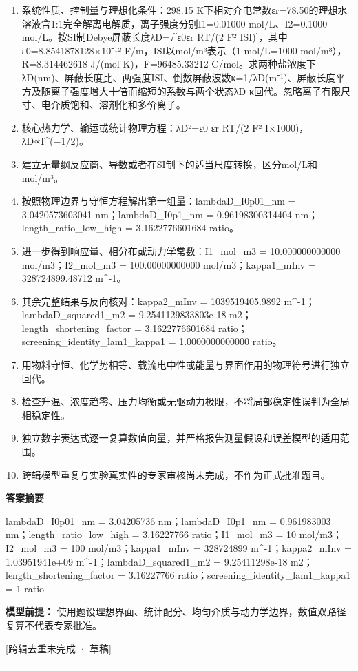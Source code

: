 \documentclass[UTF8,11pt,a4paper]{ctexart}
\begin{document}
\begin{enumerate}
\item 系统性质、控制量与理想化条件：298.15 K下相对介电常数εr=78.50的理想水溶液含1:1完全解离电解质，离子强度分别I1=0.01000 mol/L、I2=0.1000 mol/L。按SI制Debye屏蔽长度λD=√[ε0εr RT/(2 F² ISI)]，其中ε0=8.8541878128×10⁻¹² F/m，ISI以mol/m³表示（1 mol/L=1000 mol/m³），R=8.314462618 J/(mol K)，F=96485.33212 C/mol。求两种盐浓度下λD(nm)、屏蔽长度比、两强度ISI、倒数屏蔽波数κ=1/λD(m⁻¹)、屏蔽长度平方及随离子强度增大十倍而缩短的系数与两个状态λD κ回代。忽略离子有限尺寸、电介质饱和、溶剂化和多价离子。
\item 核心热力学、输运或统计物理方程：λD²=ε0 εr RT/(2 F² I×1000)，λD∝I\textasciicircum{}(−1/2)。
\item 建立无量纲反应商、导数或者在SI制下的适当尺度转换，区分mol/L和mol/m³。
\item 按照物理边界与守恒方程解出第一组量：lambdaD\_I0p01\_nm = 3.0420573603041 nm；lambdaD\_I0p1\_nm = 0.96198300314404 nm；length\_ratio\_low\_high = 3.1622776601684 ratio。
\item 进一步得到响应量、相分布或动力学常数：I1\_mol\_m3 = 10.000000000000 mol/m3；I2\_mol\_m3 = 100.00000000000 mol/m3；kappa1\_mInv = 328724899.48712 m\textasciicircum{}-1。
\item 其余完整结果与反向核对：kappa2\_mInv = 1039519405.9892 m\textasciicircum{}-1；lambdaD\_squared1\_m2 = 9.2541129833803e-18 m2；length\_shortening\_factor = 3.1622776601684 ratio；screening\_identity\_lam1\_kappa1 = 1.0000000000000 ratio。
\item 用物料守恒、化学势相等、载流电中性或能量与界面作用的物理符号进行独立回代。
\item 检查升温、浓度趋零、压力均衡或无驱动力极限，不将局部稳定性误判为全局相稳定性。
\item 独立数字表达式逐一复算数值向量，并严格报告测量假设和误差模型的适用范围。
\item 跨辑模型重复与实验真实性的专家审核尚未完成，不作为正式批准题目。
\end{enumerate}
\noindent\textbf{答案摘要}\par
lambdaD\_I0p01\_nm = 3.04205736 nm；lambdaD\_I0p1\_nm = 0.961983003 nm；length\_ratio\_low\_high = 3.16227766 ratio；I1\_mol\_m3 = 10 mol/m3；I2\_mol\_m3 = 100 mol/m3；kappa1\_mInv = 328724899 m\textasciicircum{}-1；kappa2\_mInv = 1.03951941e+09 m\textasciicircum{}-1；lambdaD\_squared1\_m2 = 9.25411298e-18 m2；length\_shortening\_factor = 3.16227766 ratio；screening\_identity\_lam1\_kappa1 = 1 ratio\par
\noindent\textbf{模型前提：}
使用题设理想界面、统计配分、均匀介质与动力学边界，数值双路径复算不代表专家批准。\par
\noindent\textcolor{red!65!black}{[跨辑去重未完成 · 草稿]} \par
\medskip\hrule\medskip
{}
\end{document}
